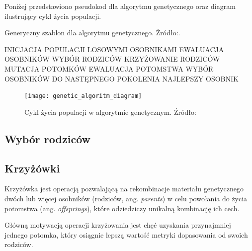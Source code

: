 \documentclass[a4paper,11pt]{article}
\begin{document}
    \bigskip

    Poniżej przedstawiono pseudokod dla algorytmu genetycznego oraz diagram ilustrujący cykl życia populacji.

    \smallskip

    \begin{algorithm}[H]
        \label{alg:genetic_algorithm_template}
        \caption{Generyczny szablon dla algorytmu genetycznego. Źródło:\cite{IntroductionToEvolutionaryComputing2015}.}
        \begin{algorithmic}
            \State INICJACJA POPULACJI LOSOWYMI OSOBNIKAMI
            \State EWALUACJA OSOBNIKÓW
                \State WYBÓR RODZICÓW
                \State KRZYŻOWANIE RODZICÓW
                \State MUTACJA POTOMKÓW
                \State EWALUACJA POTOMSTWA
                \State WYBÓR OSOBNIKÓW DO NASTĘPNEGO POKOLENIA
            \EndWhile
            \State \Return NAJLEPSZY OSOBNIK
        \end{algorithmic}
    \end{algorithm}

    \bigskip

    \begin{figure}[H]
        \label{fig:genetic_algoritm_diagram}
        \centering
        \texttt{[image: genetic\_algoritm\_diagram]}
        \caption{Cykl życia populacji w algorytmie genetycznym. Źródło:\cite{IntroductionToEvolutionaryComputing2015}}
    \end{figure}

    \subsection{Wybór rodziców}

    \subsection{Krzyżówki}

    Krzyżówka jest operacją pozwalającą na rekombinacje materiału genetycznego dwóch lub więcej osobników (rodziców, ang. \textit{parents}) w celu powołania do życia potomstwa (ang. \textit{offsprings}), które odziedziczy unikalną kombinację ich cech\cite{GeneticAlgorithmEssentials2017}.

    \bigskip

    Główną motywacją operacji krzyżowania jest chęć uzyskania przynajmniej jednego potomka, który osiągnie lepszą wartość metryki dopasowania od swoich rodziców\cite{GeneticAlgorithmEssentials2017}.
\end{document}
